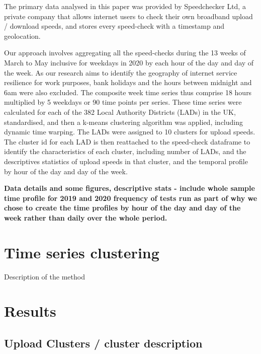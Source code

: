 \documentclass[]{interact}
\theoremstyle{plain}%
\theoremstyle{definition}
\theoremstyle{remark}
\begin{document}
The primary data analysed in this paper was provided by Speedchecker
Ltd, a private company that allows internet users to check their own
broadband upload / download speeds, and stores every speed-check with a
timestamp and geolocation.

Our approach involves aggregating all the speed-checks during the 13
weeks of March to May inclusive for weekdays in 2020 by each hour of the
day and day of the week. As our research aims to identify the geography
of internet service resilience for work purposes, bank holidays and the
hours between midnight and 6am were also excluded. The composite week
time series thus comprise 18 hours multiplied by 5 weekdays or 90 time
points per series. These time series were calculated for each of the 382
Local Authority Districts (LADs) in the UK, standardised, and then a
k-means clustering algorithm was applied, including dynamic time
warping. The LADs were assigned to 10 clusters for upload speeds. The
cluster id for each LAD is then reattached to the speed-check dataframe
to identify the characteristics of each cluster, including number of
LADs, and the descriptives statistics of upload speeds in that cluster,
and the temporal profile by hour of the day and day of the week.

\textbf{Data details and some figures, descriptive stats - include whole
sample time profile for 2019 and 2020 frequency of tests run as part of
why we chose to create the time profiles by hour of the day and day of
the week rather than daily over the whole period.}

\hypertarget{time-series-clustering}{%
\section{Time series clustering}\label{time-series-clustering}}

Description of the method

\hypertarget{results}{%
\section{Results}\label{results}}

\hypertarget{upload-clusters-cluster-description}{%
\subsection{Upload Clusters / cluster
description}\label{upload-clusters-cluster-description}}
\end{document}
